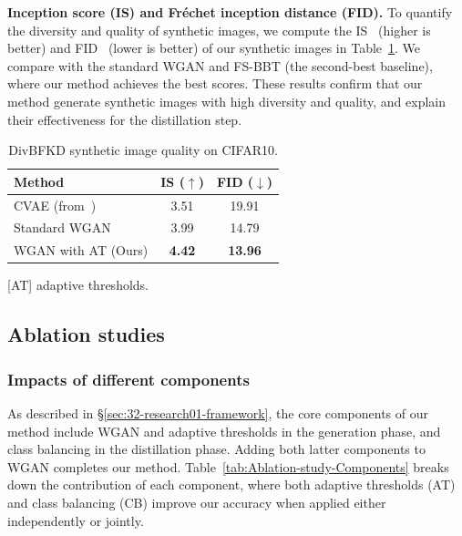 \documentclass[12pt, a4paper, twoside]{book}
\numberwithin{equation}{chapter}
\theoremstyle{plain}
\theoremstyle{definition}
\theoremstyle{remark}
\newenvironment{foldable}{}{}
\begin{document}
\begin{foldable}
  \textbf{Inception score (IS) and Fr\'{e}chet inception distance (FID).} To quantify the diversity and quality of synthetic images, we compute the IS~\cite{salimans2016improved} (higher is better) and FID~\cite{heusel2017gans} (lower is better) of our synthetic images in Table~\ref{tab:IS-FID}.
  We compare with the standard WGAN and FS-BBT (the second-best baseline), where our method achieves the best scores.
  These results confirm that our method generate synthetic images with high diversity and quality, and explain their effectiveness for the distillation step.
\end{foldable}

\begin{table}[ht]
  \centering
  \begin{threeparttable}
    \caption{DivBFKD synthetic image quality on CIFAR10.}
    \label{tab:IS-FID}
    \begin{tabular}{l c c}
      \toprule
      \textbf{Method} & \textbf{IS ($\uparrow$)} & \textbf{FID ($\downarrow$)} \\
      \midrule
      CVAE (from~\cite{nguyen2022black}) & 3.51          & 19.91 \\
      Standard WGAN                      & 3.99          & 14.79 \\
      WGAN with AT (Ours)                & \textbf{4.42} & \textbf{13.96} \\
      \bottomrule
    \end{tabular}
    \begin{tablenotes}[flushleft] \footnotesize
    \item {[AT] adaptive thresholds.}
    \end{tablenotes}
  \end{threeparttable}
\end{table}

\subsection{Ablation studies}

\subsubsection{Impacts of different components}
\begin{foldable}
  As described in \S\ref{sec:32-research01-framework}, the core components of our method include WGAN and adaptive thresholds in the generation phase, and class balancing in the distillation phase.
  Adding both latter components to WGAN completes our method.
  Table~\ref{tab:Ablation-study-Components} breaks down the contribution of each component, where both adaptive thresholds (AT) and class balancing (CB) improve our accuracy when applied either independently or jointly.
\end{foldable}
\end{document}
